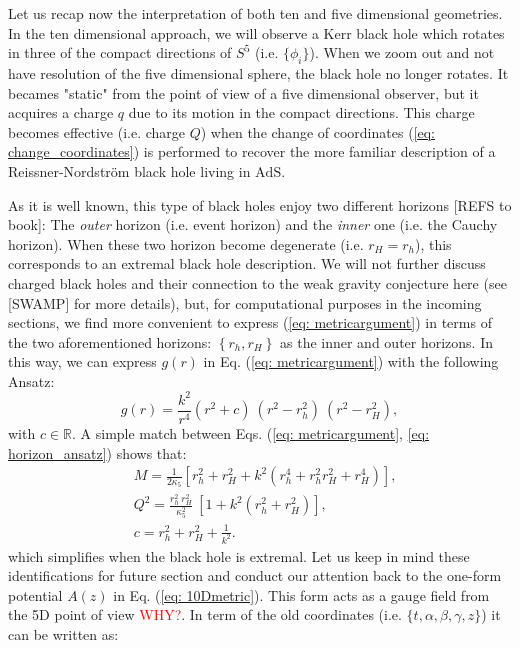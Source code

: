 Let us recap now the interpretation of both ten and five dimensional geometries. In the ten dimensional approach, we will observe a Kerr black hole which rotates in three of the compact directions of $S^{5}$ (i.e. $\{\phi_{i}\}$). When we zoom out and not have resolution of the five dimensional sphere, the black hole no longer rotates. It becames "static" from the point of view of a five dimensional observer, but it acquires a charge $q$ due to its motion in the compact directions. This charge becomes effective (i.e. charge $Q$) when the change of coordinates (\ref{eq: change_coordinates}) is performed to recover the more familiar description of a Reissner-Nordström black hole living in $\text{AdS}$.

As it is well known, this type of black holes enjoy two different horizons [REFS to book]: The \textit{outer} horizon (i.e. event horizon) and the \textit{inner} one (i.e. the Cauchy horizon). When these two horizon become degenerate (i.e. $r_{H} = r_{h}$), this corresponds to an extremal black hole description. We will not further discuss charged black holes and their connection to the weak gravity conjecture here (see [SWAMP] for more details), but, for computational purposes in the incoming sections, we find more convenient to express (\ref{eq: metricargument}) in terms of the two aforementioned horizons: $\left\{r_{h}, r_{H}\right\}$ as the inner and outer horizons. In this way, we can express $g(r)$ in Eq. (\ref{eq: metricargument}) with the following Ansatz:
\begin{equation}\label{eq: horizon_ansatz}
    g(r) = \frac{k^{2}}{r^{4}}\left(r^{2} + c\right)\:\left(r^{2} -r_{h}^{2}\right)\:\left(r^{2} - r_{H}^{2}\right),
\end{equation}
with $c \in \mathbb{R}$. A simple match between Eqs. (\ref{eq: metricargument}, \ref{eq: horizon_ansatz}) shows that:
\begin{equation}\label{eq: MQhorizons}
    \begin{split}
        &M= \frac{1}{2 \kappa_{5}}\left[r_h^{2} + r_H^{2} +k^{2} \left( r_{h}^{4}  + r_h^{2} r_H^{2}  + r_H^4 \right)\right],  \\
    &Q^2 =\frac{r_{h}^{2}\:r_{H}^{2}}{\kappa_5^2} \:\left[1 + k^{2}\left(r^{2}_{h}+ r_{H}^{2}\right)\right],\\
    &c = r_{h}^{2} + r_{H}^{2} + \tfrac{1}{k^{2}}.
    \end{split}
\end{equation}
which simplifies when the black hole is extremal. Let us keep in mind these identifications for future section and conduct our attention back to the one-form potential $A(z)$ in Eq. (\ref{eq: 10Dmetric}). This form acts as a gauge field from the 5D point of view \textcolor{red}{WHY?}. In term of the old coordinates (i.e. $\{t, \alpha, \beta, \gamma, z\}$) it can be written as:
